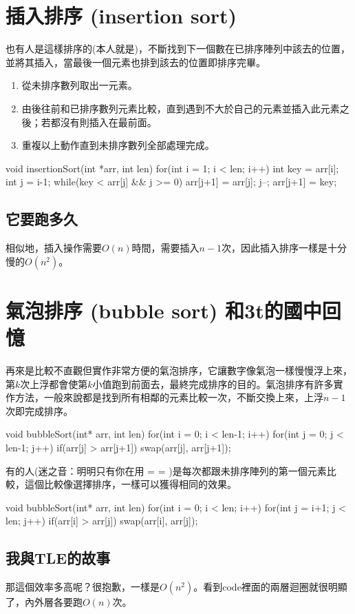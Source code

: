 \documentclass[main.tex]{subfiles}
\begin{document}
\section{插入排序 (insertion sort)}
也有人是這樣排序的(本人就是)，不斷找到下一個數在已排序陣列中該去的位置，並將其插入，當最後一個元素也排到該去的位置即排序完畢。
\begin{enumerate}
\item 從未排序數列取出一元素。
\item 由後往前和已排序數列元素比較，直到遇到不大於自己的元素並插入此元素之後；若都沒有則插入在最前面。
\item 重複以上動作直到未排序數列全部處理完成。
\end{enumerate}
\begin{C++}
void insertionSort(int *arr, int len){
    for(int i = 1; i < len; i++){
        int key = arr[i];
        int j = i-1;
        while(key < arr[j] && j >= 0){
            arr[j+1] = arr[j];
            j--;
        }
        arr[j+1] = key;
    }
}
\end{C++}
\subsection{它要跑多久}
相似地，插入操作需要$O(n)$時間，需要插入$n-1$次，因此插入排序一樣是十分慢的$O(n^2)$。

\section{氣泡排序 (bubble sort) 和3t的國中回憶}
再來是比較不直觀但實作非常方便的氣泡排序，它讓數字像氣泡一樣慢慢浮上來，第$k$次上浮都會使第$k$小值跑到前面去，最終完成排序的目的。氣泡排序有許多實作方法，一般來說都是找到所有相鄰的元素比較一次，不斷交換上來，上浮$n-1$次即完成排序。
\begin{C++}
void bubbleSort(int* arr, int len){
    for(int i = 0; i < len-1; i++)
        for(int j = 0; j < len-1; j++)
            if(arr[j] > arr[j+1])
                swap(arr[j], arr[j+1]);
}
\end{C++}
有的人(迷之音：明明只有你在用 = = )是每次都跟未排序陣列的第一個元素比較，這個比較像選擇排序，一樣可以獲得相同的效果。
\begin{C++}
void bubbleSort(int* arr, int len){
    for(int i = 0; i < len; i++)
        for(int j = i+1; j < len; j++)
            if(arr[i] > arr[j])
                swap(arr[i], arr[j]);
}
\end{C++}
\subsection{我與TLE的故事}
那這個效率多高呢？很抱歉，一樣是$O(n^2)$。看到code裡面的兩層迴圈就很明顯了，內外層各要跑$O(n)$次。
\end{document}
